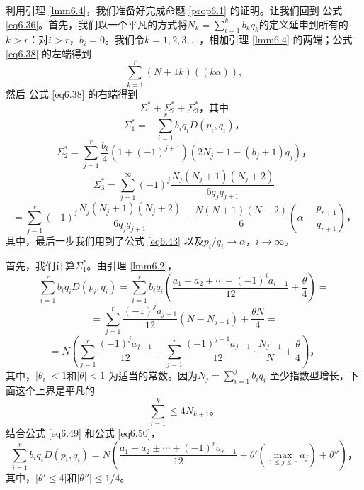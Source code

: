 \documentclass[11pt,a4paper]{article}
\theoremstyle{definition}
\newcommand{\refeq}[1]{公式 \ref{#1}}
\newcommand{\refprop}[1]{命题 \ref{#1}}
\newcommand{\reflmm}[1]{引理 \ref{#1}}
\numberwithin{equation}{section}
\newcommand{\comma}{\text{，}}
\newcommand{\juhao}{\text{。}}
\newcommand{\myone}[1]{\left(-1\right)^{#1}}
\newcommand{\ddbrace}[1]{\left(\left(#1\right)\right)}
\begin{document}
利用\reflmm{lmm6.4}，我们准备好完成\refprop{prop6.1} 的证明。让我们回到 \refeq{eq6.36}。首先，我们以一个平凡的方式将$ N_{k}=\sum_{i=1}^{k}b_{k}q_{k} $的定义延申到所有的$ k>r$：对$ i>r $，$b_{i}=0 $。我们令$ k=1,2,3,\ldots $，相加\reflmm{lmm6.4} 的两端；\refeq{eq6.38} 的左端得到
\begin{equation}\label{eq6.47}
	\sum_{k=1}^{r}\left(N+1k\right)\ddbrace{k\alpha},
\end{equation}
然后 \refeq{eq6.38} 的右端得到
\begin{equation}\label{eq6.48}
\Sigma_{1}^{\ast}+\Sigma_{2}^{\ast}+\Sigma_{3}^{\ast}\comma\text{其中}
\end{equation}
\[ \Sigma_{1}^{\ast}=-\sum_{i=1}^{r}b_{i}q_{i}D\left(p_{i},q_{i}\right)\comma \]
\[ \Sigma_{2}^{\ast}=\sum_{j=1}^{r}\dfrac{b_{i}}{4}\left(1+\myone{j+1}\right)\left(2N_{j}+1-\left(b_{j}+1\right)q_{j}\right)\comma \]
\[ \Sigma_{3}^{\ast}=\sum_{j=1}^{\infty}\myone{j}\dfrac{N_{j}\left(N_{j}+1\right)\left(N_{j}+2\right)}{6q_{j}q_{j+1}} \]
\[ =\sum_{j=1}^{r}\myone{j}\dfrac{N_{j}\left(N_{j}+1\right)\left(N_{j}+2\right)}{6q_{j}q_{j+1}}+\dfrac{N\left(N+1\right)\left(N+2\right)}{6}\left(\alpha-\dfrac{p_{r+1}}{q_{r+1}}\right)\comma \]
其中，最后一步我们用到了\refeq{eq6.43} 以及$ p_{i}/q_{i}\rightarrow\alpha\comma i\rightarrow\infty $。

首先，我们计算$\Sigma_{1}^{\ast}  $。由\reflmm{lmm6.2}，
\[ \sum_{i=1}^{r}b_{i}q_{i}D\left(p_{i},q_{i}\right)=\sum_{i=1}^{r}b_{i}q_{i}\left(\dfrac{a_{1}-a_{2}\pm\cdots+\myone{i}a_{i-1}}{12}+\dfrac{\theta}{4}\right)= \]
\[ =
\sum_{j=1}^{r}\dfrac{\myone{j}a_{j-1}}{12}\left(N-N_{j-1}\right)+\dfrac{\theta N}{4}= \]
\begin{equation}\label{eq6.49}=
N\left(\sum_{j=1}^{r}\dfrac{\myone{j}a_{j-1}}{12}+\sum_{j=1}^{r}\dfrac{\myone{j-1}a_{j-1}}{12}\cdot\dfrac{N_{j-1}}{N}+\dfrac{\theta}{4}\right)\comma
\end{equation}
其中，$ \lvert\theta_{i}\rvert <1$和$ \lvert\theta\rvert<1 $ 为适当的常数。因为$ N_{j}=\sum_{i=1}^{j}b_{i}q_{i} $ 至少指数型增长，下面这个上界是平凡的
\begin{equation}\label{eq6.50}
	\sum_{i=1}^{k}\leq4N_{k+1}\juhao
\end{equation}
结合\refeq{eq6.49} 和\refeq{eq6.50}，
\begin{equation}\label{eq6.51}
	\sum_{i=1}^{r}b_{i}q_{i}D\left(p_{i},q_{i}\right)=N\left(\dfrac{a_{1}-a_{2}\pm\cdots+\myone{r}a_{r-1}}{12}+\theta'\left(\underset{1\leq j\leq r}{\max}a_{j}\right)+\theta''\right)\comma
\end{equation}
其中，$ \lvert\theta'\leq4\rvert $和$ \lvert\theta''\rvert\leq1/4 $。
\end{document}
